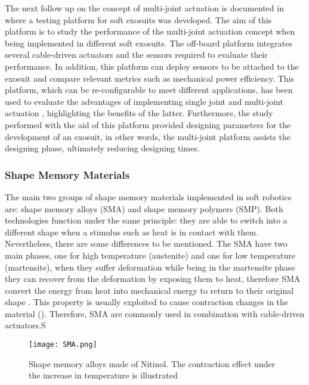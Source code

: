 The next follow up on the concept of multi-joint actuation is documented in \cite{Ding2014} where a testing platform for soft exosuits was developed. The aim of this platform is to study the performance of the multi-joint actuation concept when being implemented in different soft exosuits. The off-board platform integrates several cable-driven actuators and the sensors required to evaluate their performance. In addition, this platform can deploy sensors to be attached to the exosuit and compare relevant metrics such as mechanical power efficiency. This platform, which can be re-configurable to meet different applications, has been used to evaluate the advantages of implementing single joint and multi-joint actuation \cite{Ding2016}, highlighting the benefits of the latter. Furthermore, the study performed with the aid of this platform provided designing parameters for the development of an exosuit, in other words, the multi-joint platform assists the designing phase, ultimately reducing designing times.

\subsubsection{Shape Memory Materials}

The main two groups of shape memory materials implemented in soft robotics are: shape memory alloys (SMA) and shape memory polymers (SMP). Both technologies function under the same principle: they are able to switch into a different shape when a stimulus such as heat is in contact with them. Nevertheless, there are some differences to be mentioned. The SMA have two main phases, one for high temperature (austenite) and one for low temperature (martensite), when they suffer deformation while being in the martensite phase they can recover from the deformation by exposing them to heat, therefore SMA convert the energy from heat into mechanical energy to return to their original shape \cite{ImagesScientificInstrument2016}. This property is usually exploited to cause contraction changes in the material (). Therefore, SMA are commonly used in combination with cable-driven actuators.S
\begin{figure}[hbtp!]
    \centering
    \texttt{[image: SMA.png]}
    \caption{Shape memory alloys made of Nitinol. The contraction effect under the increase in temperature is illustrated \cite{ImagesScientificInstrument2016} }
    \label{fig:SMA}
\end{figure}

